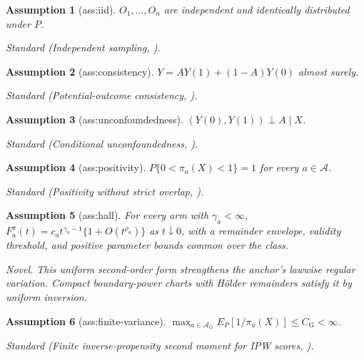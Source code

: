 \documentclass{article}
\newtheorem{assumption}{Assumption}
\begin{document}
\begin{assumption}[ass:iid]\label{ass:iid}
\(O_1,\ldots,O_n\) are independent and identically distributed under \(P\).
\par\smallskip\noindent\emph{Standard} (Independent sampling, \cite{Firpo2007}).
\end{assumption}

\begin{assumption}[ass:consistency]\label{ass:consistency}
\(Y=A Y(1)+(1-A)Y(0)\) almost surely.
\par\smallskip\noindent\emph{Standard} (Potential-outcome consistency, \cite{Firpo2007}).
\end{assumption}

\begin{assumption}[ass:unconfoundedness]\label{ass:unconfoundedness}
\((Y(0),Y(1))\perp A\mid X\).
\par\smallskip\noindent\emph{Standard} (Conditional unconfoundedness, \cite{Firpo2007}).
\end{assumption}

\begin{assumption}[ass:positivity]\label{ass:positivity}
\(P\{0<\pi_a(X)<1\}=1\) for every \(a\in\mathcal A\).
\par\smallskip\noindent\emph{Standard} (Positivity without strict overlap, \cite{AvellaMedinaDavisSamorodnitsky2025}).
\end{assumption}

\begin{assumption}[ass:hall]\label{ass:hall}
For every arm with \(\gamma_a<\infty\), \(F_a^{\pi}(t)=c_at^{\gamma_a-1}\{1+O(t^{\rho_a})\}\) as \(t\downarrow0\), with a remainder envelope, validity threshold, and positive parameter bounds common over the class.
\par\smallskip\noindent\emph{Novel.} This uniform second-order form strengthens the anchor's lawwise regular variation. Compact boundary-power charts with Hölder remainders satisfy it by uniform inversion.
\end{assumption}

\begin{assumption}[ass:finite-variance]\label{ass:finite-variance}
\(\max_{a\in\mathcal A_{\mathrm G}}E_P[1/\pi_a(X)]\le C_{\mathrm G}<\infty\).
\par\smallskip\noindent\emph{Standard} (Finite inverse-propensity second moment for IPW scores, \cite{KhanTamer2010}).
\end{assumption}
\end{document}
